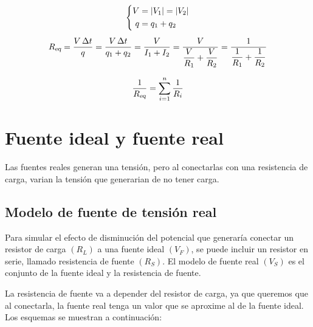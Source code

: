 \begin{gather*}
    \left\{
    \begin{aligned}
        V &= {\left| {V_1} \right|} = {\left| {V_2} \right|}
        \\
        q &= q_1 + q_2
    \end{aligned}
    \right.
    \\[1ex]
    {{R}_\textsl{{eq}}} = \frac{V \, \Delta t}{q}
    = \frac{V \, \Delta t}{q_1 + q_2}
    = \frac{V}{I_1 + I_2} = \frac{V}{\dfrac{V}{R_1} + \dfrac{V}{R_2}}
    = \frac{1}{\dfrac{1}{R_1}+\dfrac{1}{R_2}}
\end{gather*}

\begin{mdframed}[style=MyFrame1]
    \begin{prop}
    \end{prop}
    \begin{equation*}
        \frac{1}{{{R}_\textsl{{eq}}}} = \sum_{i=1}^n \frac{1}{R_i}
    \end{equation*}
\end{mdframed}


\section{Fuente ideal y fuente real}

Las fuentes reales generan una tensión, pero al conectarlas con una resistencia de carga, varian la tensión que generarian de no tener carga.


\subsection{Modelo de fuente de tensión real}

Para simular el efecto de disminución del potencial que generaría conectar un resistor de carga $(R_L)$ a una fuente ideal $(V_F)$, se puede incluir un resistor en serie, llamado resistencia de fuente $(R_S)$.
El modelo de fuente real $(V_S)$ es el conjunto de la fuente ideal y la resistencia de fuente.

La resistencia de fuente va a depender del resistor de carga, ya que queremos que al conectarla, la fuente real tenga un valor que se aproxime al de la fuente ideal.
Los esquemas se muestran a continuación:

\begin{multicols}{2}
    \begin{center}
        \def\svgwidth{0.9\linewidth}
        
    \end{center}
    \begin{center}
        \def\svgwidth{0.9\linewidth}
        
    \end{center}
\end{multicols}

